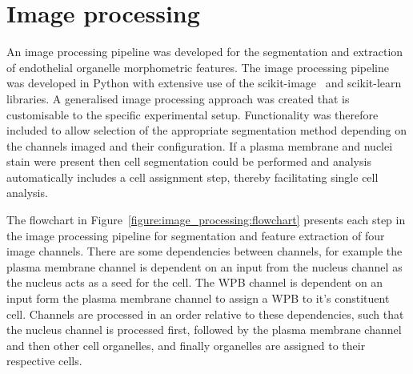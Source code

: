 \section{Image processing}
\label{endothelial_morphometry:image_processing}
An image processing pipeline was developed for the segmentation and extraction of endothelial organelle morphometric features. The image processing pipeline was developed in Python with extensive use of the scikit-image~\cite{VanderWalt2014} and scikit-learn~\cite{Pedregosa2011} libraries. A generalised image processing approach was created that is customisable to the specific experimental setup. Functionality was therefore included to allow selection of the appropriate segmentation method depending on the channels imaged and their configuration. If a plasma membrane and nuclei stain were present then cell segmentation could be performed and analysis automatically includes a cell assignment step, thereby facilitating single cell analysis.

The flowchart in Figure~\ref{figure:image_processing:flowchart} presents each step in the image processing pipeline for segmentation and feature extraction of four image channels. There are some dependencies between channels, for example the plasma membrane channel is dependent on an input from the nucleus channel as the nucleus acts as a seed for the cell. The WPB channel is dependent on an input form the plasma membrane channel to assign a WPB to it's constituent cell. Channels are processed in an order relative to these dependencies, such that the nucleus channel is processed first, followed by the plasma membrane channel and then other cell organelles, and finally organelles are assigned to their respective cells.


